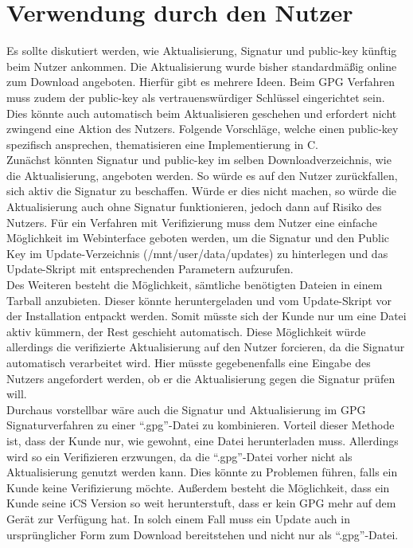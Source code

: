 \documentclass[thesis=bachelor,faculty=cb]{hsmw-thesis}
\begin{document}
{\section{Verwendung durch den Nutzer}
Es sollte diskutiert werden, wie Aktualisierung, Signatur und public-key künftig beim Nutzer ankommen. Die Aktualisierung wurde bisher standardmäßig online \cite{IsegDL} zum Download angeboten. Hierfür gibt es mehrere Ideen. Beim GPG Verfahren muss zudem der public-key als vertrauenswürdiger Schlüssel eingerichtet sein. Dies könnte auch automatisch beim Aktualisieren geschehen und erfordert nicht zwingend eine Aktion des Nutzers. Folgende Vorschläge, welche einen public-key spezifisch ansprechen, thematisieren eine Implementierung in C.
\\[1cm]
Zunächst könnten Signatur und public-key im selben Downloadverzeichnis, wie die Aktualisierung, angeboten werden. So würde es auf den Nutzer zurückfallen, sich aktiv die Signatur zu beschaffen. Würde er dies nicht machen, so würde die Aktualisierung auch ohne Signatur funktionieren, jedoch dann auf Risiko des Nutzers. Für ein Verfahren mit Verifizierung muss dem Nutzer eine einfache Möglichkeit im Webinterface geboten werden, um die Signatur und den Public Key im Update-Verzeichnis (/mnt/user/data/updates) zu hinterlegen und das Update-Skript mit entsprechenden Parametern aufzurufen.
\\[1cm]
Des Weiteren besteht die Möglichkeit, sämtliche benötigten Dateien in einem Tarball anzubieten. Dieser könnte heruntergeladen und vom Update-Skript vor der Installation entpackt werden. Somit müsste sich der Kunde nur um eine Datei aktiv kümmern, der Rest geschieht automatisch. Diese Möglichkeit würde allerdings die verifizierte Aktualisierung auf den Nutzer forcieren, da die Signatur automatisch verarbeitet wird. Hier müsste gegebenenfalls eine Eingabe des Nutzers angefordert werden, ob er die Aktualisierung gegen die Signatur prüfen will.
\\[1cm]
Durchaus vorstellbar wäre auch die Signatur und Aktualisierung im GPG Signaturverfahren zu einer \enquote{.gpg}-Datei zu kombinieren. Vorteil dieser Methode ist, dass der Kunde nur, wie gewohnt, eine Datei herunterladen muss. Allerdings wird so ein Verifizieren erzwungen, da die \enquote{.gpg}-Datei vorher nicht als Aktualisierung genutzt werden kann. Dies könnte zu Problemen führen, falls ein Kunde keine Verifizierung möchte. Außerdem besteht die Möglichkeit, dass ein Kunde seine iCS Version so weit herunterstuft, dass er kein GPG mehr auf dem Gerät zur Verfügung hat. In solch einem Fall muss ein Update auch in ursprünglicher Form zum Download bereitstehen und nicht nur als \enquote{.gpg}-Datei.
}
\end{document}

